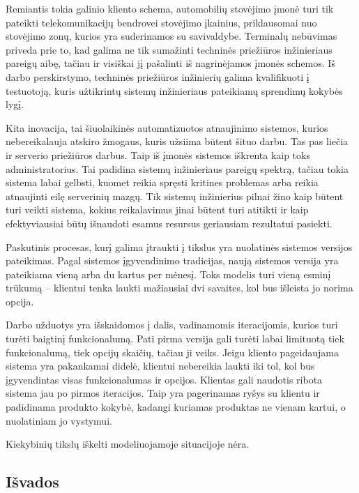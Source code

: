 \documentclass[10pt]{IEEEtran}
\begin{document}
            Remiantis tokia galinio kliento schema, automobilių stovėjimo įmonė turi tik pateikti telekomunikacijų bendrovei stovėjimo įkainius, priklausomai nuo stovėjimo zonų, kurios yra suderinamos su savivaldybe. Terminalų nebūvimas priveda prie to, kad galima ne tik sumažinti techninės priežiūros inžinieriaus pareigų aibę, tačiau ir visiškai jį pašalinti iš nagrinėjamos įmonės schemos. Iš darbo perskirstymo, techninės priežiūros inžinierių galima kvalifikuoti į testuotoją, kuris užtikrintų sistemų inžinieriaus pateikiamų sprendimų kokybės lygį. 

            Kita inovacija, tai šiuolaikinės automatizuotos atnaujinimo sistemos, kurios nebereikalauja atskiro žmogaus, kuris užsiima būtent šituo darbu. Tas pas liečia ir serverio priežiūros darbus. Taip iš įmonės sistemos iškrenta kaip toks administratorius. Tai padidina sistemų inžinieriaus pareigų spektrą, tačiau tokia sistema labai gelbsti, kuomet reikia spręsti kritines problemas arba reikia atnaujinti eilę serverinių mazgų. Tik sistemų inžinierius pilnai žino kaip būtent turi veikti sistema, kokius reikalavimus jinai būtent turi atitikti ir kaip efektyviausiai būtų išnaudoti esamus resursus geriausiam rezultatui pasiekti.

            Paskutinis procesas, kurį galima įtraukti į tikslus yra nuolatinės sistemos versijos pateikimas. Pagal sistemos įgyvendinimo tradicijas, naują sistemos versija yra pateikiama vieną arba du kartus per mėnesį. Toks modelis turi vieną esminį trūkumą -- klientui tenka laukti mažiausiai dvi savaites, kol bus išleista jo norima opcija. 

            Darbo užduotys yra išskaidomos į dalis, vadinamomis iteracijomis, kurios turi turėti baigtinį funkcionalumą. Pati pirma versija gali turėti labai limituotą tiek funkcionalumą, tiek opcijų skaičių, tačiau ji veiks. Jeigu kliento pageidaujama sistema yra pakankamai didelė, klientui nebereikia laukti iki tol, kol bus įgyvendintas visas funkcionalumas ir opcijos. Klientas gali naudotis ribota sistema jau po pirmos iteracijos. Taip yra pagerinamas ryšys su klientu ir padidinama produkto kokybė, kadangi kuriamas produktas ne vienam kartui, o nuolatiniam jo vystymui.

            Kiekybinių tikslų iškelti modeliuojamoje situacijoje nėra.

        \subsection{Išvados}
\end{document}
